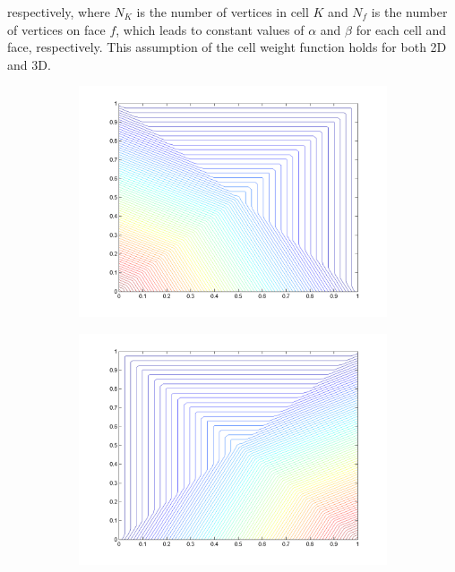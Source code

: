 \noindent respectively, where $N_K$ is the number of vertices in cell $K$ and $N_f$ is the number of vertices on face $f$, which leads to constant values of $\alpha$ and $\beta$ for each cell and face, respectively. This assumption of the cell weight function holds for both 2D and 3D.

\pagebreak
\begin{figure}
\label{fig::2D_PWL_unit_square_basis_functions}
\centering
	\begin{subfigure}[b]{0.48\textwidth}
		\centering
		\includegraphics[width=\textwidth]{figures/sec_BF/PWL_square_contour_1.png}
		\caption{}
	\end{subfigure}
	\hfill
	\begin{subfigure}[b]{0.48\textwidth}
		\centering
		\includegraphics[width=\textwidth]{figures/sec_BF/PWL_square_contour_2.png}

\end{subfigure}
\end{figure}
